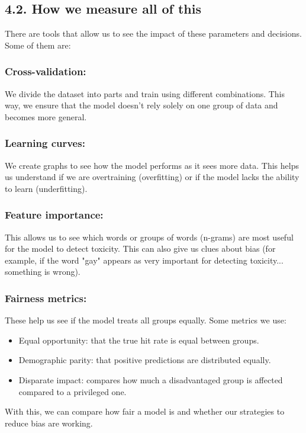 \documentclass[a4paper,12pt]{article}
\begin{document}
\subsection*{4.2. How we measure all of this}

There are tools that allow us to see the impact of these parameters and decisions. Some of them are:

\subsubsection*{Cross-validation:}
We divide the dataset into parts and train using different combinations. This way, we ensure that the model doesn't rely solely on one group of data and becomes more general.

\subsubsection*{Learning curves:}
We create graphs to see how the model performs as it sees more data. This helps us understand if we are overtraining (overfitting) or if the model lacks the ability to learn (underfitting).

\subsubsection*{Feature importance:}
This allows us to see which words or groups of words (n-grams) are most useful for the model to detect toxicity. This can also give us clues about bias (for example, if the word "gay" appears as very important for detecting toxicity... something is wrong).

\subsubsection*{Fairness metrics:}
These help us see if the model treats all groups equally. Some metrics we use:
\begin{itemize}
    \item Equal opportunity: that the true hit rate is equal between groups.
    \item Demographic parity: that positive predictions are distributed equally.
    \item Disparate impact: compares how much a disadvantaged group is affected compared to a privileged one.
\end{itemize}
With this, we can compare how fair a model is and whether our strategies to reduce bias are working.
\end{document}
